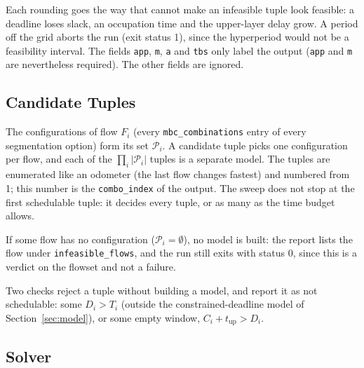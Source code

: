 \documentclass[11pt]{article}
\begin{document}
Each rounding goes the way that cannot make an infeasible tuple look feasible:
a deadline loses slack, an occupation time and the upper-layer delay grow. A
period off the grid aborts the run (exit status 1), since the hyperperiod
would not be a feasibility interval. The fields \texttt{app}, \texttt{m},
\texttt{a} and \texttt{tbs} only label the output (\texttt{app} and
\texttt{m} are nevertheless required). The other fields are ignored.

\subsection*{Candidate Tuples}

The configurations of flow $F_i$ (every \texttt{mbc\_combinations} entry of
every segmentation option) form its set $\mathcal{P}_i$. A candidate tuple
picks one configuration per flow, and each of the $\prod_i |\mathcal{P}_i|$
tuples is a separate model. The tuples are enumerated like an odometer (the
last flow changes fastest) and numbered from 1; this number is the
\texttt{combo\_index} of the output. The sweep does not stop at the first
schedulable tuple: it decides every tuple, or as many as the time budget
allows.

If some flow has no configuration ($\mathcal{P}_i = \emptyset$), no model is
built: the report lists the flow under \texttt{infeasible\_flows}, and the run
still exits with status 0, since this is a verdict on the flowset and not a
failure.

Two checks reject a tuple without building a model, and report it as not
schedulable: some $D_i > T_i$ (outside the constrained-deadline model of
Section~\ref{sec:model}), or some empty window, $C_i + t_\mathrm{up} > D_i$.

\subsection*{Solver}
\end{document}

